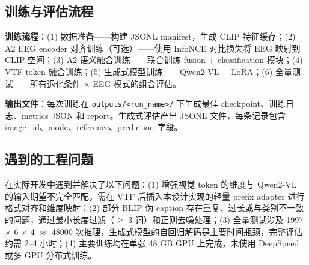 \subsection{训练与评估流程}

\textbf{训练流程}：(1) 数据准备——构建 JSONL manifest，生成 CLIP 特征缓存；(2) A2 EEG encoder 对齐训练（可选）——使用 InfoNCE 对比损失将 EEG 映射到 CLIP 空间；(3) A2 语义融合训练——联合训练 fusion + classification 模块；(4) VTF token 融合训练；(5) 生成式模型训练——Qwen2-VL + LoRA；(6) 全量测试——所有退化条件 $\times$ EEG 模式的组合评估。

\textbf{输出文件}：每次训练在 \texttt{outputs/<run\_name>/} 下生成最佳 checkpoint、训练日志、metrics JSON 和 report。生成式评估产出 JSONL 文件，每条记录包含 image\_id、mode、reference、prediction 字段。

\subsection{遇到的工程问题}

在实际开发中遇到并解决了以下问题：(1) 增强视觉 token 的维度与 Qwen2-VL 的输入期望不完全匹配，需在 VTF 后插入本设计实现的轻量 prefix adapter 进行格式对齐和维度映射；(2) 部分 BLIP 伪 caption 存在重复、过长或与类别不一致的问题，通过最小长度过滤（$\geq$ 3 词）和正则去噪处理；(3) 全量测试涉及 1997 $\times$ 6 $\times$ 4 $\approx$ 48000 次推理，生成式模型的自回归解码是主要时间瓶颈，完整评估约需 2--4 小时；(4) 主要训练均在单张 48 GB GPU 上完成，未使用 DeepSpeed 或多 GPU 分布式训练。
